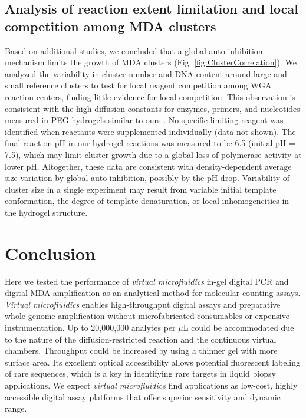 \subsection{Analysis of reaction extent limitation and local competition among MDA clusters}
Based on additional studies, we concluded that a global auto-inhibition mechanism limits the growth of MDA clusters (Fig. \ref{fig:ClusterCorrelation}). We analyzed the variability in cluster number and DNA content around large and small reference clusters to test for local reagent competition among WGA reaction centers, finding little evidence for local competition. This observation is consistent with the high diffusion constants for enzymes, primers, and nucleotides measured in PEG hydrogels similar to ours \cite{Wu:2009ez,Weber:2009fe}. No specific limiting reagent was identified when reactants were supplemented individually (data not shown). The final reaction pH in our hydrogel reactions was measured to be 6.5 (initial pH = 7.5), which may limit cluster growth due to a global loss of polymerase activity at lower pH. Altogether, these data are consistent with density-dependent average size variation by global auto-inhibition, possibly by the pH drop. Variability of cluster size in a single experiment may result from variable initial template conformation, the degree of template denaturation, or local inhomogeneities in the hydrogel structure.

\section{Conclusion}
Here we tested the performance of \textit{virtual microfluidics} in-gel digital PCR and digital MDA amplification as an analytical method for molecular counting assays. \textit{Virtual microfluidics} enables high-throughput digital assays and preparative whole-genome amplification without microfabricated consumables or expensive instrumentation. Up to 20,000,000 analytes per $\mu$L could be accommodated due to the nature of the diffusion-restricted reaction and the continuous virtual chambers. Throughput could be increased by using a thinner gel with more surface area. Its excellent optical accessibility allows potential fluorescent labeling of rare sequences, which is a key in identifying rare targets in liquid biopsy applications. We expect \textit{virtual microfluidics} find applications as low-cost, highly accessible digital assay platforms that offer superior sensitivity and dynamic range. 


